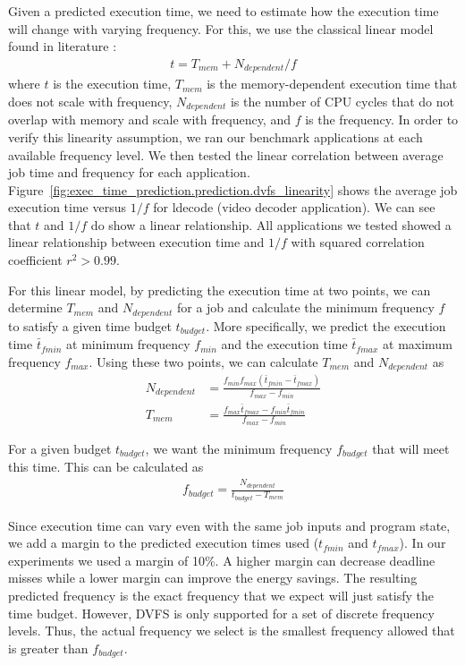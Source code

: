 Given a predicted execution time, we need to estimate how the execution time
will change with varying frequency. For this, we use the classical linear model
found in literature \cite{xie-pldi03, wu-micro05}:
\begin{align*}
  t = T_{mem} + N_{dependent}/f
\end{align*}
where $t$ is the execution time, $T_{mem}$ is the memory-dependent execution
time that does not scale with frequency, $N_{dependent}$ is the number of CPU
cycles that do not overlap with memory and scale with frequency, and $f$ is the
frequency.  In order to verify this linearity assumption, we ran our benchmark
applications at each available frequency level.  We then tested the linear
correlation between average job time and frequency for each application.
Figure~\ref{fig:exec_time_prediction.prediction.dvfs_linearity} shows the
average job execution time versus $1/f$ for ldecode (video decoder
application). We can see that $t$ and $1/f$ do show a linear relationship. 
All applications we tested showed a linear relationship between execution time
and $1/f$ with squared correlation coefficient $r^2 > 0.99$.

For this linear model, by predicting the execution time at two points, we can
determine $T_{mem}$ and $N_{dependent}$ for a job and calculate the minimum
frequency $f$ to satisfy a given time budget $t_{budget}$. More specifically,
we predict the execution time $\bar{t}_{fmin}$ at minimum frequency $f_{min}$
and the execution time $\bar{t}_{fmax}$ at maximum frequency $f_{max}$. Using
these two points, we can calculate $T_{mem}$ and $N_{dependent}$ as
\begin{align*}
  N_{dependent} &= \frac{f_{min}f_{max}(\bar{t}_{fmin} - \bar{t}_{fmax})}{f_{max} - f_{min}} \\
  T_{mem} &= \frac{f_{max}\bar{t}_{fmax} - f_{min}\bar{t}_{fmin}}{f_{max} - f_{min}}
\end{align*}

For a given budget $t_{budget}$, we want the minimum frequency $f_{budget}$
that will meet this time. This can be calculated as
\begin{align*}
  f_{budget} = \frac{N_{dependent}}{t_{budget} - T_{mem}}
\end{align*}

Since execution time can vary even with the same job inputs and program state,
we add a margin to the predicted execution times used ($t_{fmin}$ and
$t_{fmax}$). In our experiments we used a margin of 10\%. A higher margin can
decrease deadline misses while a lower margin can improve the energy savings.
The resulting predicted frequency is the exact frequency that we expect will
just satisfy the time budget. However, DVFS is only supported for a set of
discrete frequency levels. Thus, the actual frequency we select is the smallest
frequency allowed that is greater than $f_{budget}$. 

